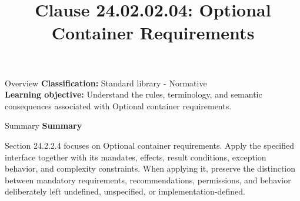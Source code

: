 \documentclass[10pt,letterpaper]{article}
\title{Clause 24.02.02.04: Optional Container Requirements}
\author{}
\date{}
\begin{document}
\maketitle
\begin{CornellOverviewBox}{Overview}
\textbf{Classification:} Standard library - Normative\\[2pt]
\textbf{Learning objective:} Understand the rules, terminology, and semantic consequences associated with Optional container requirements.
\end{CornellOverviewBox}\begin{CornellSummaryBox}{Summary}
{\sffamily\bfseries\color{Accent} Summary}\par\vspace{3pt}Section 24.2.2.4 focuses on Optional container requirements. Apply the specified interface together with its mandates, effects, result conditions, exception behavior, and complexity constraints. When applying it, preserve the distinction between mandatory requirements, recommendations, permissions, and behavior deliberately left undefined, unspecified, or implementation-defined.
\end{CornellSummaryBox}
\end{document}
